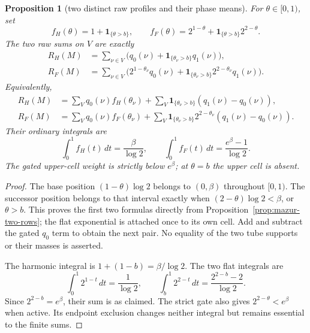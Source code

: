 \documentclass[11pt]{article}
\newtheorem{proposition}{Proposition}
\theoremstyle{remark}\newtheorem{remark}[proposition]{Remark}
\begin{document}
\begin{proposition}[two distinct raw profiles and their phase means]
\label{prop:mazur-profile-phase}
For $\theta\in[0,1)$, set
\[
 f_H(\theta)=1+\mathbf1_{\{\theta>b\}},\qquad
 f_F(\theta)=2^{1-\theta}
                 +\mathbf1_{\{\theta>b\}}2^{2-\theta}.
\]
The two raw sums on $V$ are exactly
\begin{align}
 R_H(M)&=\sum_{\nu\in V}
        \big(q_0(\nu)+\mathbf1_{\{\theta_\nu>b\}}q_1(\nu)\big),\\
 R_F(M)&=\sum_{\nu\in V}
        \big(2^{1-\theta_\nu}q_0(\nu)
          +\mathbf1_{\{\theta_\nu>b\}}2^{2-\theta_\nu}q_1(\nu)\big).
 \label{eq:mazur-literal-profiles}
\end{align}
Equivalently,
\begin{align}
 R_H(M)&=\sum_Vq_0(\nu)f_H(\theta_\nu)
       +\sum_V\mathbf1_{\{\theta_\nu>b\}}(q_1(\nu)-q_0(\nu)),\\
 R_F(M)&=\sum_Vq_0(\nu)f_F(\theta_\nu)
       +\sum_V\mathbf1_{\{\theta_\nu>b\}}2^{2-\theta_\nu}
                                      (q_1(\nu)-q_0(\nu)).
 \label{eq:mazur-neighbour-residual}
\end{align}
Their ordinary integrals are
\begin{equation}
 \int_0^1 f_H(t)\,dt=\frac{\beta}{\log2},\qquad
 \int_0^1 f_F(t)\,dt=\frac{e^\beta-1}{\log2}.
 \label{eq:mazur-phase-means}
\end{equation}
The gated upper-cell weight is strictly below $e^\beta$;
at $\theta=b$ the upper cell is absent.
\end{proposition}
\begin{proof}
The base position $(1-\theta)\log2$ belongs to $(0,\beta)$
throughout $[0,1)$. The successor position belongs to that
interval exactly when $(2-\theta)\log2<\beta$, or $\theta>b$.
This proves the first two formulas directly from
Proposition~\ref{prop:mazur-two-rows}; the flat exponential is
attached once to its own cell. Add and subtract the gated $q_0$
term to obtain the next pair. No equality of the two tube supports
or their masses is asserted.

The harmonic integral is $1+(1-b)=\beta/\log2$.
The two flat integrals are
\[
 \int_0^1 2^{1-t}\,dt=\frac1{\log2},\qquad
 \int_b^1 2^{2-t}\,dt=\frac{2^{2-b}-2}{\log2}.
\]
Since $2^{2-b}=e^\beta$, their sum is as claimed.
The strict gate also gives $2^{2-\theta}<e^\beta$ when active.
Its endpoint exclusion changes neither integral but remains
essential to the finite sums.
\end{proof}
\end{document}
